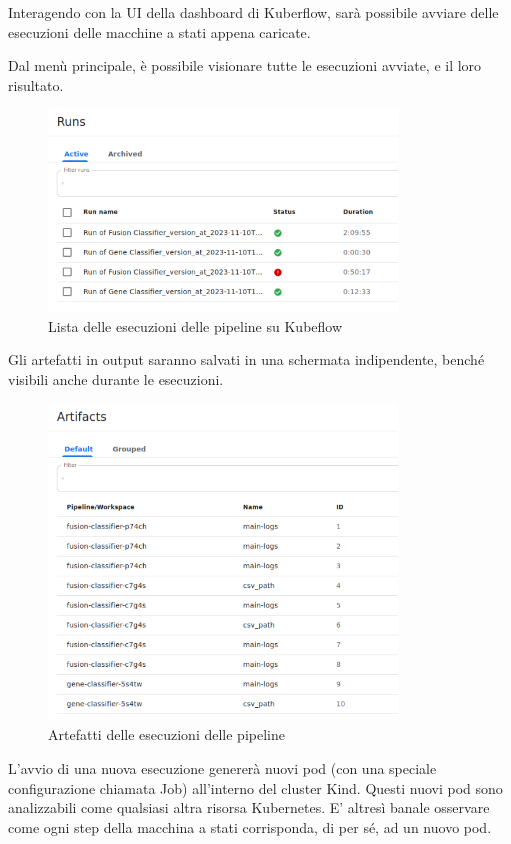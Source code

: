 Interagendo con la UI della dashboard di Kuberflow, sarà possibile avviare delle esecuzioni delle macchine a stati appena caricate. 

Dal menù principale, è possibile visionare tutte le esecuzioni avviate, e il loro risultato.

\begin{figure}[H]
    \centering
    \includegraphics[width=350px]{figures/ch4and5/runs.png}
    \caption[Lista delle esecuzioni delle pipeline su Kubeflow]{Lista delle esecuzioni delle pipeline su Kubeflow}
    \label{fig:cha6:runs}
\end{figure}

Gli artefatti in output saranno salvati in una schermata indipendente, benché visibili anche durante le esecuzioni.

\begin{figure}[H]
    \centering
    \includegraphics[width=350px]{figures/ch4and5/artifacts.png}
    \caption[Artefatti delle esecuzioni delle pipeline]{Artefatti delle esecuzioni delle pipeline}
    \label{fig:cha6:art}
\end{figure}

L'avvio di una nuova esecuzione genererà nuovi pod (con una speciale configurazione chiamata Job) all'interno del cluster Kind. Questi nuovi pod sono analizzabili come qualsiasi altra risorsa Kubernetes. E' altresì banale osservare come ogni step della macchina a stati corrisponda, di per sé, ad un nuovo pod.

